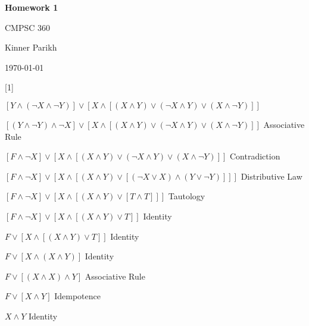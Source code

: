 \documentclass{article} %
\newcommand{\question}[2][]{\begin{flushleft}
        \textbf{Question #1}: \textit{#2}

\end{flushleft}}
\newcommand{\maketitletwo}[2][]{\begin{center}
        \Large{\textbf{Homework #1}
            
            CMPSC 360} %
        \vspace{5pt}
        
        \normalsize{Kinner Parikh  %
        
        \today}        %
        \vspace{15pt}
        
\end{center}}
\begin{document}
    \maketitletwo[1]  %
    
    \question[1]{}

    $[Y \land (\neg X  \land \neg Y)] \lor [X \land [(X \land Y) \lor (\neg X \land Y) \lor (X \land \neg Y)]]$

    $[(Y \land \neg Y) \land \neg X] \lor [X \land [(X \land Y) \lor (\neg X \land Y) \lor (X \land \neg Y)]]$ Associative Rule

    $[F \land \neg X] \lor [X \land [(X \land Y) \lor (\neg X \land Y) \lor (X \land \neg Y)]]$ Contradiction

    $[F \land \neg X] \lor [X \land [(X \land Y) \lor [(\neg X \lor X) \land (Y \lor \neg Y)]]]$ Distributive Law

    $[F \land \neg X] \lor [X \land [(X \land Y) \lor [T \land T]]]$ Tautology

    $[F \land \neg X] \lor [X \land [(X \land Y) \lor T]]$ Identity

    $F \lor [X \land [(X \land Y) \lor T]]$ Identity

    $F \lor [X \land (X \land Y)]$ Identity

    $F \lor [(X \land X) \land Y]$ Associative Rule

    $F \lor [X \land Y]$ Idempotence

    $X \land Y$ Identity



    
\end{document}

